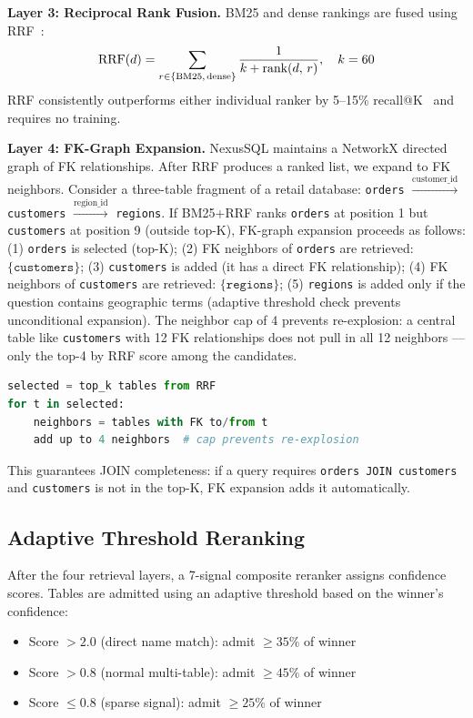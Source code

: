 \documentclass[conference]{IEEEtran}
\begin{document}
\textbf{Layer 3: Reciprocal Rank Fusion.}
BM25 and dense rankings are fused using RRF~\cite{rrf}:
\begin{equation}
\text{RRF}(d) = \sum_{r \in \{\text{BM25,\,dense}\}}
\frac{1}{k + \text{rank}(d,\, r)}, \quad k = 60
\label{eq:rrf}
\end{equation}
RRF consistently outperforms either individual ranker by 5--15\%
recall@K~\cite{rrf} and requires no training.

\textbf{Layer 4: FK-Graph Expansion.}
NexusSQL maintains a NetworkX directed graph of FK relationships.
After RRF produces a ranked list, we expand to FK neighbors.
Consider a three-table fragment of a retail database:
\texttt{orders} $\xrightarrow{\text{customer\_id}}$ \texttt{customers}
$\xrightarrow{\text{region\_id}}$ \texttt{regions}.
If BM25+RRF ranks \texttt{orders} at position 1 but \texttt{customers}
at position 9 (outside top-K), FK-graph expansion proceeds as follows:
(1) \texttt{orders} is selected (top-K); (2) FK neighbors of
\texttt{orders} are retrieved: $\{\texttt{customers}\}$;
(3) \texttt{customers} is added (it has a direct FK relationship);
(4) FK neighbors of \texttt{customers} are retrieved: $\{\texttt{regions}\}$;
(5) \texttt{regions} is added only if the question contains geographic
terms (adaptive threshold check prevents unconditional expansion).
The neighbor cap of 4 prevents re-explosion: a central table like
\texttt{customers} with 12 FK relationships does not pull in all 12
neighbors --- only the top-4 by RRF score among the candidates.

\begin{lstlisting}[language=Python,basicstyle=\scriptsize\ttfamily]
selected = top_k tables from RRF
for t in selected:
    neighbors = tables with FK to/from t
    add up to 4 neighbors  # cap prevents re-explosion
\end{lstlisting}

This guarantees JOIN completeness: if a query requires
\texttt{orders JOIN customers} and \texttt{customers} is not in
the top-K, FK expansion adds it automatically.

\subsection{Adaptive Threshold Reranking}

After the four retrieval layers, a 7-signal composite reranker
assigns confidence scores. Tables are admitted using an adaptive
threshold based on the winner's confidence:
\begin{itemize}
  \item Score $> 2.0$ (direct name match): admit $\geq 35\%$ of winner
  \item Score $> 0.8$ (normal multi-table): admit $\geq 45\%$ of winner
  \item Score $\leq 0.8$ (sparse signal): admit $\geq 25\%$ of winner
\end{itemize}
\end{document}
